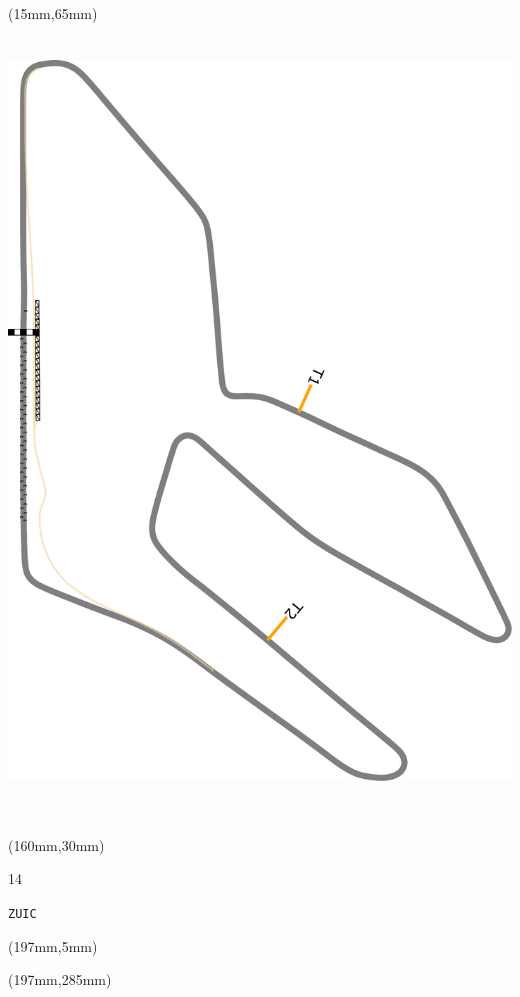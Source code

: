 \begin{textblock*}{185mm}(15mm,65mm)%
\centering
\mbox{\includegraphics[width=185mm,height=210mm,keepaspectratio]{PT/ZUIC.pdf}}
\end{textblock*}
\begin{textblock*}{40mm}(160mm,30mm)%
\Large
\par{} 
\par14 
\par\hfill\tiny\tt ZUIC\\
\end{textblock*}
\begin{textblock*}{20mm}(197mm,5mm)%
\fbox{\thepage}
\label{ZUIC}
\end{textblock*}
\begin{textblock*}{20mm}(197mm,285mm)%
\fbox{\thepage}
\end{textblock*}

\null\newpage
